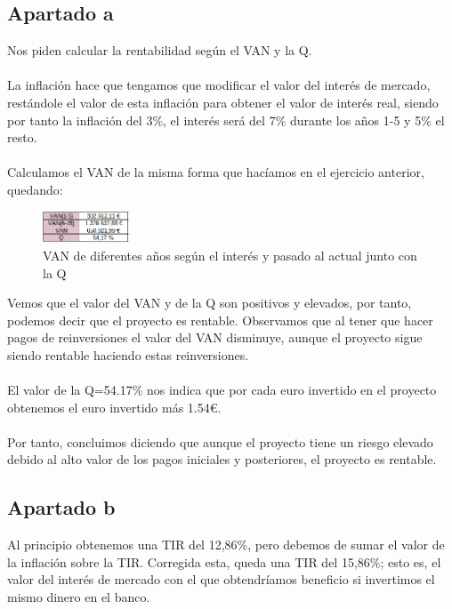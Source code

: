 \documentclass[11pt,letterpaper,onecolumn]{article}
\begin{document}
\subsection{Apartado a}
Nos piden calcular la rentabilidad según el VAN y la Q.\\
\\
La inflación hace que tengamos que modificar el valor del interés de mercado, restándole el valor de esta inflación para obtener el valor de interés real, siendo por tanto la inflación del 3\%, el interés será del 7\% durante los años 1-5 y 5\% el resto.\\
\\
Calculamos el VAN de la misma forma que hacíamos en el ejercicio anterior, quedando:
\begin{figure}[H]
	\centering
	\includegraphics[width=0.23\textwidth]{imagen/ej4a_van.PNG}
	\caption{VAN de diferentes años según el interés y pasado al actual junto con  la Q}
	\label{fig:imagen-ej4a_van-PNG}
\end{figure}
Vemos que el valor del VAN y de la Q son positivos y elevados, por tanto, podemos decir que el proyecto es rentable. Observamos que al tener que hacer pagos de reinversiones el valor del VAN disminuye, aunque el proyecto sigue siendo rentable haciendo estas reinversiones. \\
\\
El valor de la Q=54.17\% nos indica que por cada euro invertido en el proyecto obtenemos el euro invertido más 1.54€.\\
\\
Por tanto, concluimos diciendo que aunque el proyecto tiene un riesgo elevado debido al alto valor de los pagos iniciales y posteriores, el proyecto es rentable. 

\subsection{Apartado b}
Al principio obtenemos una TIR del 12,86\%, pero debemos de sumar el valor de la inflación sobre la TIR. Corregida esta, queda una TIR del 15,86\%; esto es, el valor del interés de mercado con el que obtendríamos beneficio si invertimos el mismo dinero en el banco. 
\end{document}
